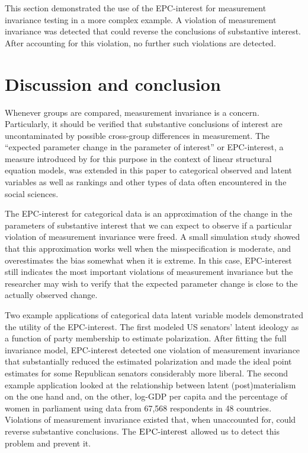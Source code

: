\documentclass[letterpaper,12pt]{article}
\newcommand{\da}{\textrm{{\sc {EPC}}-interest}}
\begin{document}
\bigskip
This section demonstrated the use of the EPC-interest for measurement invariance testing in a more complex example. A violation of measurement invariance was detected that could reverse the conclusions of substantive interest. After accounting for this violation, no further such violations are detected. 


\section{Discussion and conclusion}
\label{sec:discussion}


Whenever groups are compared, measurement invariance is a concern. Particularly, it should be verified that substantive conclusions of interest are uncontaminated by possible cross-group differences in measurement. The ``expected parameter change in the parameter of interest'' or EPC-interest, a measure introduced by \citet{Oberski:WP:EPC-interest} for this purpose in the context of linear structural equation models, was extended in this paper  to categorical observed and latent variables as well as rankings and other types of data often encountered in the social sciences. 

The EPC-interest for categorical data is an approximation of the change in the parameters of substantive interest that we can expect to observe if a particular violation of measurement invariance were freed. A small simulation study showed that this approximation works well when the misspecification is moderate, and overestimates the bias somewhat when it is extreme. In this case, EPC-interest still indicates the most important violations of measurement invariance but the researcher may wish to verify that the expected parameter change is close to the actually observed change. 

Two example applications of categorical data latent variable models demonstrated the utility of the EPC-interest. The first modeled US senators' latent ideology as a function of party membership to estimate polarization. After fitting the full invariance model, EPC-interest detected one violation of measurement invariance that substantially reduced the estimated polarization and made the ideal point estimates for some Republican senators considerably more liberal. The second example application looked at the relationship between latent (post)materialism on the one hand and, on the other, log-GDP per capita and the percentage of women in parliament using data from 67,568 respondents in 48 countries. Violations of measurement invariance existed that, when unaccounted for, could reverse substantive conclusions. The $\da{}$ allowed us to detect this problem and prevent it.
\end{document}
